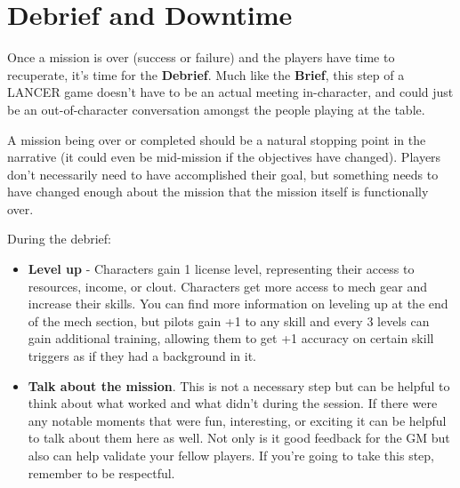 \section{Debrief and Downtime}

Once a mission is over (success or failure) and the players have time to recuperate, it’s time for the \textbf{Debrief}. Much like the \textbf{Brief}, this step of a LANCER game doesn’t have to be an actual meeting in-character, and could just be an out-of-character conversation amongst the people playing at the table. 

A mission being over or completed should be a natural stopping point in the narrative (it could even be mid-mission if the objectives have changed). Players don’t necessarily need to have accomplished their goal, but something needs to have changed enough about the mission that the mission itself is functionally over. 

During the debrief:
\begin{itemize}
\item \textbf{Level up} - Characters gain 1 license level, representing their access to resources, income, or clout. Characters get more access to mech gear and increase their skills. You can find more information on leveling up at the end of the mech section, but pilots gain +1 to any skill and every 3 levels can gain additional training, allowing them to get +1 accuracy on certain skill triggers as if they had a background in it.
\item \textbf{Talk about the mission}. This is not a necessary step but can be helpful to think about what worked and what didn’t during the session. If there were any notable moments that were fun, interesting, or exciting it can be helpful to talk about them here as well. Not only is it good feedback for the GM but also can help validate your fellow players. If you’re going to take this step, remember to be respectful.
\end{itemize}  